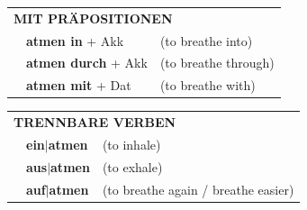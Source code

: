 \documentclass[10pt,a4paper]{revtex4-2}
\begin{document}
\begin{verbbox}
\vspace{10pt}

\begin{tabular}{lll}
\multicolumn{3}{l}{\textbf{MIT PRÄPOSITIONEN}}\\
& \textbf{atmen in} + Akk & (to breathe into)\\
& \textbf{atmen durch} + Akk & (to breathe through)\\
& \textbf{atmen mit} + Dat & (to breathe with)\\
\end{tabular}
\hfill
\begin{tabular}{lll}
\multicolumn{3}{l}{\textbf{TRENNBARE VERBEN}}\\
& \textbf{ein$|$atmen} & (to inhale)\\
& \textbf{aus$|$atmen} & (to exhale)\\
& \textbf{auf$|$atmen} & (to breathe again / breathe easier)\\
\end{tabular}
\vspace{-5pt}
\end{verbbox}
\end{document}
